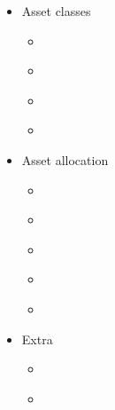 \documentclass[letterpaper,10pt,english]{jupyterBook}
\begin{document}
\begin{itemize}
\item {} 
\sphinxAtStartPar
Asset classes

\begin{itemize}
\item {} 
\sphinxAtStartPar
{\hyperref[\detokenize{ch/assets/intro::doc}]{}}

\item {} 
\sphinxAtStartPar
{\hyperref[\detokenize{ch/assets/bonds::doc}]{}}

\item {} 
\sphinxAtStartPar
{\hyperref[\detokenize{ch/assets/equity::doc}]{}}

\item {} 
\sphinxAtStartPar
{\hyperref[\detokenize{ch/assets/etfs::doc}]{}}

\end{itemize}
\end{itemize}
\begin{itemize}
\item {} 
\sphinxAtStartPar
Asset allocation

\begin{itemize}
\item {} 
\sphinxAtStartPar
{\hyperref[\detokenize{ch/investing/intro::doc}]{}}

\item {} 
\sphinxAtStartPar
{\hyperref[\detokenize{ch/investing/mpt::doc}]{}}

\item {} 
\sphinxAtStartPar
{\hyperref[\detokenize{ch/investing/capm::doc}]{}}

\item {} 
\sphinxAtStartPar
{\hyperref[\detokenize{ch/investing/strategic-tactical::doc}]{}}

\item {} 
\sphinxAtStartPar
{\hyperref[\detokenize{ch/investing/rebalancing::doc}]{}}

\end{itemize}
\end{itemize}
\begin{itemize}
\item {} 
\sphinxAtStartPar
Extra

\begin{itemize}
\item {} 
\sphinxAtStartPar
{\hyperref[\detokenize{ch/extra/intro::doc}]{}}

\item {} 
\sphinxAtStartPar
{\hyperref[\detokenize{ch/extra/euristhics::doc}]{}}

\end{itemize}
\end{itemize}
\end{document}
